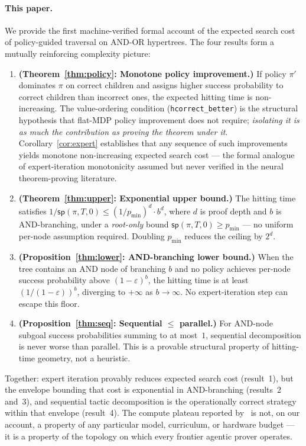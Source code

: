 \documentclass[reqno,11pt]{amsart}
\newcommand{\sP}{\mathsf{sp}}
\theoremstyle{plain}
\theoremstyle{definition}
\theoremstyle{remark}
\begin{document}
\paragraph{This paper.} We provide the first machine-verified formal account of the expected search cost of policy-guided traversal on AND-OR hypertrees. The four results form a mutually reinforcing complexity picture:

\begin{enumerate}[leftmargin=*,label=\textbf{\arabic*.}]
\item \textbf{(Theorem~\ref{thm:policy}: Monotone policy improvement.)} If policy $\pi'$ dominates $\pi$ on correct children and assigns higher success probability to correct children than incorrect ones, the expected hitting time is non-increasing. The value-ordering condition (\texttt{hcorrect\_better}) is the structural hypothesis that flat-MDP policy improvement does not require; \emph{isolating it is as much the contribution as proving the theorem under it}. Corollary~\ref{cor:expert} establishes that any sequence of such improvements yields monotone non-increasing expected search cost --- the formal analogue of expert-iteration monotonicity assumed but never verified in the neural theorem-proving literature.

\item \textbf{(Theorem~\ref{thm:upper}: Exponential upper bound.)} The hitting time satisfies $1/\sP(\pi,T,0) \le (1/p_{\min})^d \cdot b^d$, where $d$ is proof depth and $b$ is AND-branching, under a \emph{root-only} bound $\sP(\pi,T,0) \ge p_{\min}$ --- no uniform per-node assumption required. Doubling $p_{\min}$ reduces the ceiling by $2^d$.

\item \textbf{(Proposition~\ref{thm:lower}: AND-branching lower bound.)} When the tree contains an AND node of branching $b$ and no policy achieves per-node success probability above $(1-\varepsilon)^b$, the hitting time is at least $(1/(1-\varepsilon))^b$, diverging to $+\infty$ as $b\to\infty$. No expert-iteration step can escape this floor.

\item \textbf{(Proposition~\ref{thm:seq}: Sequential $\le$ parallel.)} For AND-node subgoal success probabilities summing to at most~$1$, sequential decomposition is never worse than parallel. This is a provable structural property of hitting-time geometry, not a heuristic.
\end{enumerate}

Together: expert iteration provably reduces expected search cost (result~1), but the envelope bounding that cost is exponential in AND-branching (results~2 and~3), and sequential tactic decomposition is the operationally correct strategy within that envelope (result~4). The compute plateau reported by~\citet{AletheiaWhitepaper2026} is not, on our account, a property of any particular model, curriculum, or hardware budget --- it is a property of the topology on which every frontier agentic prover operates.
\end{document}
